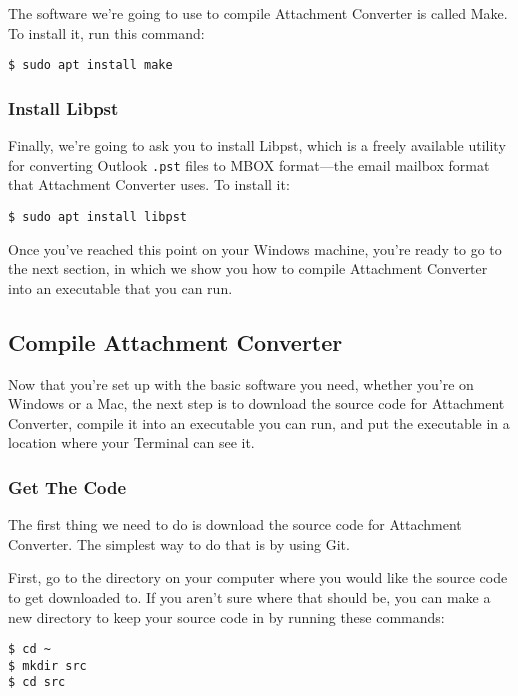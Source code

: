 \documentclass[11pt]{article}
\begin{document}
The software we're going to use to compile Attachment Converter is
called Make.  To install it, run this command:

\begin{verbatim}
$ sudo apt install make
\end{verbatim}

\subsubsection{Install Libpst}
\label{sec:org69f227c}

Finally, we're going to ask you to install Libpst, which is a freely
available utility for converting Outlook \texttt{.pst} files to MBOX
format---the email mailbox format that Attachment Converter uses.  To
install it:

\begin{verbatim}
$ sudo apt install libpst
\end{verbatim}

Once you've reached this point on your Windows machine, you're ready
to go to the next section, in which we show you how to compile
Attachment Converter into an executable that you can run.

\subsection{Compile Attachment Converter \label{org2c8ae9f}}
\label{sec:orgf4a2f02}

Now that you're set up with the basic software you need, whether
you're on Windows or a Mac, the next step is to download the source
code for Attachment Converter, compile it into an executable you can
run, and put the executable in a location where your Terminal can see
it.

\subsubsection{Get The Code}
\label{sec:org188fe01}

The first thing we need to do is download the source code for
Attachment Converter.  The simplest way to do that is by using Git.

First, go to the directory on your computer where you would like the
source code to get downloaded to.  If you aren't sure where that
should be, you can make a new directory to keep your source code in by
running these commands:

\begin{verbatim}
$ cd ~
$ mkdir src
$ cd src
\end{verbatim}
\end{document}
